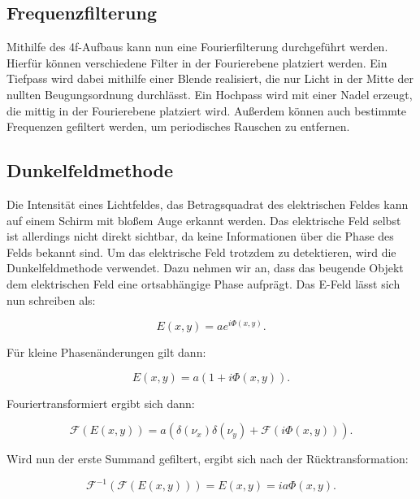 \subsection{Frequenzfilterung}
Mithilfe des 4f-Aufbaus kann nun eine Fourierfilterung durchgeführt werden. Hierfür können verschiedene Filter in der Fourierebene platziert werden. Ein Tiefpass wird dabei mithilfe einer Blende realisiert, die nur Licht in der Mitte der nullten Beugungsordnung durchlässt. Ein Hochpass wird mit einer Nadel erzeugt, die mittig in der Fourierebene platziert wird. Außerdem können auch bestimmte Frequenzen gefiltert werden, um periodisches Rauschen zu entfernen.

\subsection{Dunkelfeldmethode}
\label{Dunkelfeld}
Die Intensität eines Lichtfeldes, das Betragsquadrat des elektrischen Feldes kann auf einem Schirm mit bloßem Auge erkannt werden. Das elektrische Feld selbst ist allerdings nicht direkt sichtbar, da keine Informationen über die Phase des Felds bekannt sind. Um das elektrische Feld trotzdem zu detektieren, wird die Dunkelfeldmethode verwendet. Dazu nehmen wir an, dass das beugende Objekt dem elektrischen Feld eine ortsabhängige Phase aufprägt. Das E-Feld lässt sich nun schreiben als:

\begin{equation}
	E(x, y) = a e^{i\Phi\left( x, y\right) }.
\end{equation}

Für kleine Phasenänderungen gilt dann:

\begin{equation}
	E(x, y) = a\left( 1 + i\Phi\left( x, y\right) \right) .
\end{equation}

Fouriertransformiert ergibt sich dann:

\begin{equation}
	\mathcal{F}\left( E\left( x, y\right) \right)  = a\left( \delta\left( \nu_x\right) \delta\left( \nu_y\right) + \mathcal{F}\left( i\Phi\left( x, y\right) \right) \right) .
\end{equation}

Wird nun der erste Summand gefiltert, ergibt sich nach der Rücktransformation:

\begin{equation}
	\mathcal{F}^{-1}\left( \mathcal{F}\left( E\left( x, y\right) \right) \right) = E\left( x, y\right) = ia\Phi\left( x, y\right) .
\end{equation}

